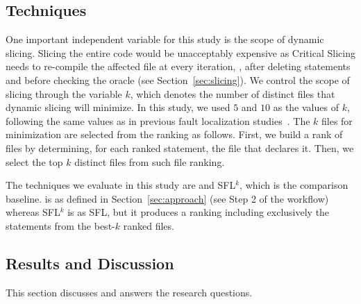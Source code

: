 \documentclass{article}
\begin{document}
\subsection{Techniques}
One important independent variable for this study is the scope of
dynamic slicing. Slicing the entire code would be unacceptably
expensive as Critical Slicing needs to re-compile the affected file at
every iteration, \ie{}, after deleting statements and before checking
the oracle (see Section~\ref{sec:slicing}). We control the scope of
slicing through the variable $k$, which denotes the number of distinct
files that dynamic slicing will minimize. In this study, we used $5$ and
$10$ as the values of $k$, following the same values as in previous fault
localization studies~\cite{ang-perez-van-deursen-rui-2017}.
The $k$ files for minimization are selected
from the \sfl{} ranking as follows. First, we build a rank of files by
determining, for each ranked statement, the file that declares
it. Then, we select the top $k$ distinct files from such file ranking.

The techniques we evaluate in this study are  and
SFL$^{k}$, which is the comparison baseline.  is as defined
in Section~\ref{sec:approach} (see Step 2 of the workflow) whereas
SFL$^{k}$ is as SFL, but it produces a ranking including exclusively
the statements from the best-$k$ ranked files.





\subsection{Results and Discussion}

This section discusses and answers the research questions.
\end{document}
